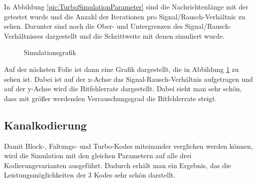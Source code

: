 In Abbildung \ref{pic:TurboSimulationParameter} sind die Nachrichtenlänge mit der getestet wurde und die Anzahl der Iterationen pro Signal/Rausch-Verhältnis zu sehen. Darunter sind noch die Ober- und Untergrenzen des Signal/Rausch-Verhältnisses dargestellt und die Schrittweite mit denen simuliert wurde.

\begin{figure}[!ht]
\centering
{}
\caption{Simulationsgrafik}
\label{pic:TurboSimulationPlot}
\end{figure}

Auf der nächsten Folie ist dann eine Grafik dargestellt, die in Abbildung \ref{pic:TurboSimulationPlot} zu sehen ist. Dabei ist auf der x-Achse das Signal-Rausch-Verhältnis aufgetragen und auf der y-Achse wird die Bitfehlerrate dargestellt. Dabei sieht man sehr schön, dass mit größer werdenden Verrauschungsgrad die Bitfehlerrate steigt.

\subsection{Kanalkodierung}
\label{sec:visualization_simulations_channelcoding}
Damit Block-, Faltungs- und Turbo-Kodes miteinander verglichen werden können, wird die Simulation mit den gleichen Parametern auf alle drei Kodierungsvarianten ausgeführt. Dadurch erhält man ein Ergebnis, das die Leistungsmöglichkeiten der 3 Kodes sehr schön darstellt.

